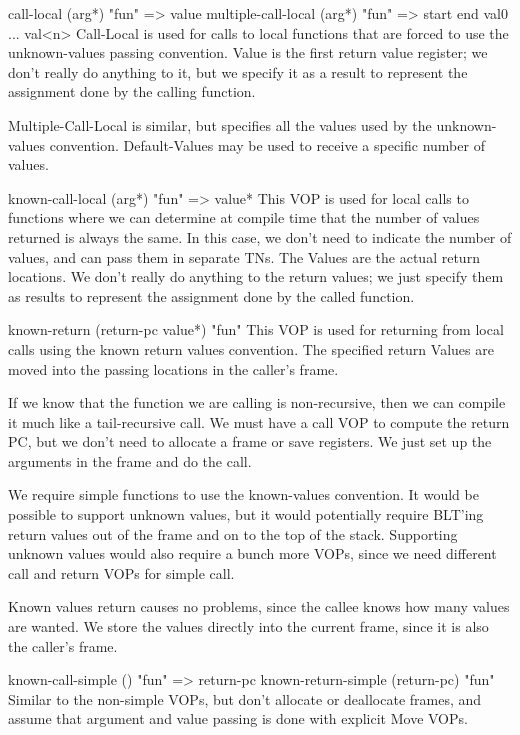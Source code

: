{\begin{itemize, spread 0, spacing 1}
call-local (arg*) "fun" => value
multiple-call-local (arg*) "fun" => start end val0 ... val<n>
    Call-Local is used for calls to local functions that are forced to use the
    unknown-values passing convention.  Value is the first return value
    register; we don't really do anything to it, but we specify it as a result
    to represent the assignment done by the calling function.

    Multiple-Call-Local is similar, but specifies all the values used by the
    unknown-values convention.  Default-Values may be used to receive a
    specific number of values.

known-call-local (arg*) "fun" => value*
    This VOP is used for local calls to functions where we can determine at
    compile time that the number of values returned is always the same.  In
    this case, we don't need to indicate the number of values, and can pass
    them in separate TNs.  The Values are the actual return locations.  We
    don't really do anything to the return values; we just specify them as
    results to represent the assignment done by the called function.

known-return (return-pc value*) "fun"
    This VOP is used for returning from local calls using the known return
    values convention.  The specified return Values are moved into the passing
    locations in the caller's frame.


If we know that the function we are calling is non-recursive, then we can
compile it much like a tail-recursive call.  We must have a call VOP to compute
the return PC, but we don't need to allocate a frame or save registers.  We
just set up the arguments in the frame and do the call.

We require simple functions to use the known-values convention.  It would be
possible to support unknown values, but it would potentially require BLT'ing
return values out of the frame and on to the top of the stack.  Supporting
unknown values would also require a bunch more VOPs, since we need different
call and return VOPs for simple call.

Known values return causes no problems, since the callee knows how many values
are wanted.  We store the values directly into the current frame, since it is
also the caller's frame.

known-call-simple () "fun" => return-pc
known-return-simple (return-pc) "fun"
    Similar to the non-simple VOPs, but don't allocate or deallocate frames,
    and assume that argument and value passing is done with explicit Move VOPs.


\end{itemize, spread 0, spacing 1}}
